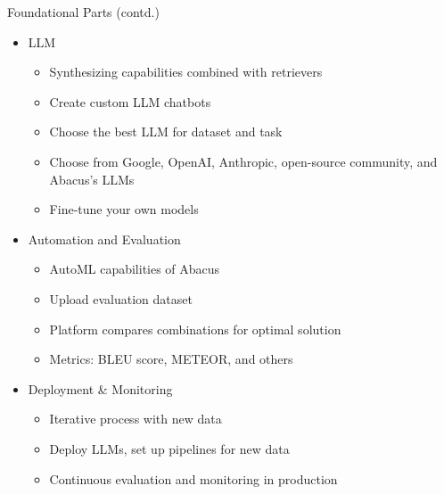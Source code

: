 \begin{frame}[fragile]{Foundational Parts (contd.)}

\begin{itemize}
    \item LLM
    \begin{itemize}
        \item Synthesizing capabilities combined with retrievers
        \item Create custom LLM chatbots
        \item Choose the best LLM for dataset and task
        \item Choose from Google, OpenAI, Anthropic, open-source community, and Abacus's LLMs
        \item Fine-tune your own models
    \end{itemize}
    \item Automation and Evaluation
    \begin{itemize}
        \item AutoML capabilities of Abacus
        \item Upload evaluation dataset
        \item Platform compares combinations for optimal solution
        \item Metrics: BLEU score, METEOR, and others
    \end{itemize}
    \item Deployment \& Monitoring
    \begin{itemize}
        \item Iterative process with new data
        \item Deploy LLMs, set up pipelines for new data
        \item Continuous evaluation and monitoring in production
    \end{itemize}
\end{itemize}
\end{frame}




